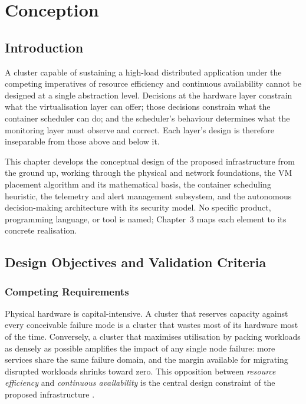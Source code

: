 \documentclass[12pt,a4paper]{report}
\begin{document}
\chapter{Conception}

\section{Introduction}

A cluster capable of sustaining a high-load distributed application under the
competing imperatives of resource efficiency and continuous availability cannot be
designed at a single abstraction level. Decisions at the hardware layer constrain
what the virtualisation layer can offer; those decisions constrain what the container
scheduler can do; and the scheduler's behaviour determines what the monitoring layer
must observe and correct. Each layer's design is therefore inseparable from those
above and below it.

This chapter develops the conceptual design of the proposed infrastructure from the
ground up, working through the physical and network foundations, the VM placement
algorithm and its mathematical basis, the container scheduling heuristic, the
telemetry and alert management subsystem, and the autonomous decision-making
architecture with its security model. No specific product, programming language, or
tool is named; Chapter~3 maps each element to its concrete realisation.

\section{Design Objectives and Validation Criteria}

\subsection{Competing Requirements}

Physical hardware is capital-intensive. A cluster that reserves capacity against
every conceivable failure mode is a cluster that wastes most of its hardware most
of the time. Conversely, a cluster that maximises utilisation by packing workloads
as densely as possible amplifies the impact of any single node failure: more services
share the same failure domain, and the margin available for migrating disrupted
workloads shrinks toward zero. This opposition between \textit{resource efficiency}
and \textit{continuous availability} is the central design constraint of the proposed
infrastructure \cite{yang2025task, alahmad2024multiple}.
\end{document}
